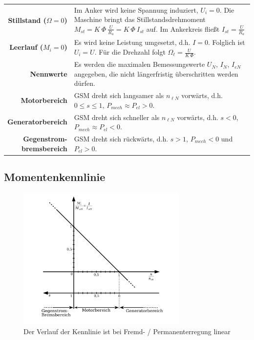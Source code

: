 \documentclass[11pt]{article}
\begin{document}
\begin{center}
\bgroup
\begin{longtable}{r p{12cm}}
	\textbf{Stillstand ($\Omega = 0$)} & Im Anker wird keine Spannung induziert, $U_i = 0$. Die Maschine bringt das Stillstandsdrehmoment $M_{st} = K ~ \Phi ~ \frac{U}{R_a} = K ~ \Phi ~ I_{st}$ auf. Im Ankerkreis fließt $I_{st} = \frac{U}{R_a}$ \\
	\textbf{Leerlauf ($M_i = 0$)} & Es wird keine Leistung umgesetzt, d.h. $I = 0$. Folglich ist $U_i = U$. Für die Drehzahl folgt $\Omega_\ell = \frac{U}{K ~ \Phi}$. \\
	\textbf{Nennwerte} & Es werden die maximalen Bemessungswerte $U_N$, $I_N$, $I_{eN}$ angegeben, die nicht längerfristig überschritten werden dürfen. \\
	\textbf{Motorbereich} & GSM dreht sich langsamer als $n_{\ell N}$ vorwärts, d.h. $0 \leq s \leq 1$, $P_{mech} \approx P_{el} > 0$. \\
	\textbf{Generatorbereich} & GSM dreht sich schneller als $n_{\ell N}$ vorwärts, d.h. $s < 0$, $P_{mech} \approx P_{el} < 0$. \\
	\pbox{20cm}{\textbf{Gegenstrom-} \\ \textbf{bremsbereich}} & GSM dreht sich rückwärts, d.h. $s > 1$, $P_{mech} < 0$ und $P_{el} > 0$.
\end{longtable}
\egroup
\end{center}

\subsection*{Momentenkennlinie}
\begin{figure}[H]
	\centering
	\includegraphics[width=0.75\textwidth]{img/gleichstrommaschine_kennlinie.pdf}
	\caption*{Der Verlauf der Kennlinie ist bei Fremd- / Permanenterregung linear}
\end{figure}
\end{document}
